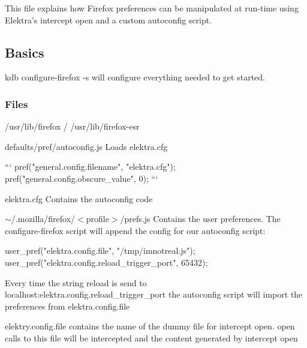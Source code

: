 This file explains how Firefox preferences can be manipulated at run-\/time using Elektra’s intercept open and a custom autoconfig script.

\subsection*{Basics}

{\ttfamily kdb configure-\/firefox -\/s} will configure everything needed to get started.

\subsubsection*{Files}


\begin{DoxyItemize}
\item {\ttfamily /usr/lib/firefox} / {\ttfamily /usr/lib/firefox-\/esr}
\begin{DoxyItemize}
\item {\ttfamily defaults/pref/autoconfig.\+js} Loads {\ttfamily elektra.\+cfg}
\end{DoxyItemize}
\end{DoxyItemize}

\begin{DoxyVerb} ```
 pref("general.config.filename", "elektra.cfg");
 pref("general.config.obscure_value", 0);
```
\end{DoxyVerb}

\begin{DoxyItemize}
\item {\ttfamily elektra.\+cfg} Contains the autoconfig code
\end{DoxyItemize}

{\ttfamily $\sim$/.mozilla/firefox/$<$profile$>$/prefs.js} Contains the user preferences. The configure-\/firefox script will append the config for our autoconfig script\+:


\begin{DoxyCode}
user\_pref("elektra.config.file", "/tmp/imnotreal.js");
user\_pref("elektra.config.reload\_trigger\_port", 65432);
\end{DoxyCode}


Every time the string {\ttfamily reload} is send to localhost\+:{\ttfamily elektra.\+config.\+reload\+\_\+trigger\+\_\+port} the autoconfig script will import the preferences from {\ttfamily elektra.\+config.\+file}

{\ttfamily elektry.\+config.\+file} contains the name of the dummy file for {\ttfamily intercept open}. {\ttfamily open} calls to this file will be intercepted and the content generated by {\ttfamily intercept open}

